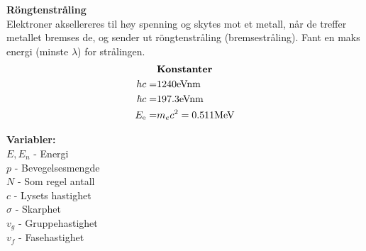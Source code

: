 \documentclass[8pt, A4paper, norsk]{extarticle}
\begin{document}
\begin{multicols*}{3}
\centering \textbf{Röngtenstråling} \\
Elektroner aksellereres til høy spenning og skytes mot et metall, når de treffer metallet bremses de, og sender ut röngtenstråling (bremsestråling). Fant en maks energi (minste $\lambda$) for strålingen.
		\begin{align*}
&\text{\textbf{Konstanter}} \\
hc =& 1240 \text{eVnm} \\
\hbar c =& 197.3 \text{eVnm} \\
E_{\text{e}} =& m_e c^2 = 0.511 \text{MeV}
		\end{align*}
		\begin{flushleft}
\textbf{Variabler:} \\
$E, E_n$ - Energi \\
$p$ - Bevegelsesmengde \\
$N$ - Som regel antall \\
$c$ - Lysets hastighet \\
$\sigma$ - Skarphet \\
$v_g$ - Gruppehastighet \\
$v_f$ - Fasehastighet
		\end{flushleft}
\end{multicols*}
\end{document}
